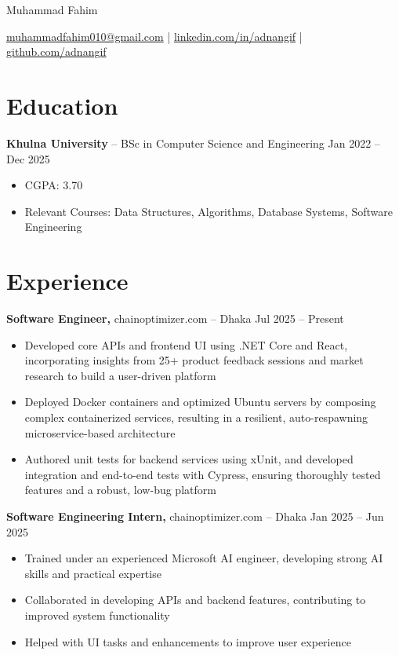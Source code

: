 \documentclass[11pt]{article}       %
\begin{document}
\centerline{\Huge Muhammad Fahim}

\vspace{5pt}

\centerline{\href{mailto:muhammadfahim010@gmail.com}{muhammadfahim010@gmail.com} | \href{https://linkedin.com/in/adnangif/}{linkedin.com/in/adnangif} | \href{https://github.com/adnangif}{github.com/adnangif}}

\vspace{-10pt}

\section*{Education}
\textbf{Khulna University} -- BSc in Computer Science and Engineering \hfill Jan 2022 -- Dec 2025 \\
\vspace{-6.5pt}
\begin{itemize}
    \item CGPA: 3.70
    \item Relevant Courses: Data Structures, Algorithms, Database Systems, Software Engineering
\end{itemize}

\vspace{-18.5pt}

\section*{Experience}
\textbf{Software Engineer,} {chainoptimizer.com} -- Dhaka \hfill Jul 2025 -- Present \\
\vspace{-9pt}
\begin{itemize}
  \item Developed core APIs and frontend UI using .NET Core and React, incorporating insights from 25+ product feedback sessions and market research to build a user-driven platform
  \item Deployed Docker containers and optimized Ubuntu servers by composing complex containerized services, resulting in a resilient, auto-respawning microservice-based architecture
  \item Authored unit tests for backend services using xUnit, and developed integration and end-to-end tests with Cypress, ensuring thoroughly tested features and a robust, low-bug platform
\end{itemize}

\textbf{Software Engineering Intern,} {chainoptimizer.com} -- Dhaka \hfill Jan 2025 -- Jun 2025 \\
\vspace{-9pt}
\begin{itemize}
  \item Trained under an experienced Microsoft AI engineer, developing strong AI skills and practical expertise
  \item Collaborated in developing APIs and backend features, contributing to improved system functionality
  \item Helped with UI tasks and enhancements to improve user experience
\end{itemize}
\end{document}
